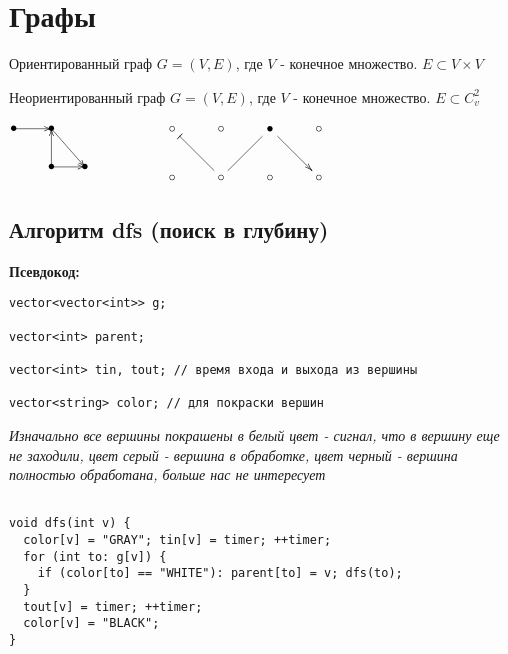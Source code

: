 
\section{Графы}

\begin{definition}
  Ориентированный граф $G = (V, E)$, где $V$ - конечное множество. $E \subset V \times V$
\end{definition}
\begin{definition}
  Неориентированный граф $G = (V, E)$, где $V$ - конечное множество. $E \subset C_v^2$
\end{definition}

\begin{center}
  $\xymatrix{
  *=0{\bullet} \ar[r] & *=0{\bullet} \ar[rd]\\
  & *=0{\bullet}\ar[r] \ar[u] & *=0{\bullet}\\ 
}\hspace{20mm}\xymatrix{
{\circ}\ar@{|->} '[dr] 
'[rr]
[drrr]
& {\circ} & {\bullet} & {\circ} \\
{\circ} & {\circ} & {\circ} & {\circ} }$
\end{center}

\subsection{Алгоритм dfs (поиск в глубину)}
\textbf{Псевдокод:}

\begin{verbatim}
vector<vector<int>> g;

vector<int> parent;

vector<int> tin, tout; // время входа и выхода из вершины

vector<string> color; // для покраски вершин
\end{verbatim}

\textit{Изначально все вершины покрашены в белый цвет - сигнал, что в вершину еще не заходили, цвет серый - вершина в обработке, цвет черный - вершина полностью обработана, больше нас не интересует}

\begin{verbatim}
 
void dfs(int v) {
  color[v] = "GRAY"; tin[v] = timer; ++timer;
  for (int to: g[v]) {
    if (color[to] == "WHITE"): parent[to] = v; dfs(to);
  }
  tout[v] = timer; ++timer;
  color[v] = "BLACK";
}
\end{verbatim}

